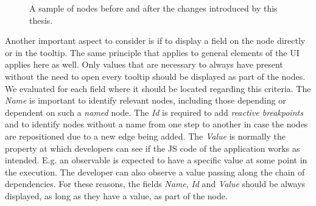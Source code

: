 \begin{figure}[!h]
	\centering
	\hfill
	\caption{A sample of nodes before and after the changes introduced by this thesis.}
	\label{fig:Nodes}
\end{figure}
Another important aspect to consider is if to display a field on the node directly or in the tooltip. The same principle that applies to general elements of the UI applies here as well. Only values that are necessary to always have present without the need to open every tooltip should be displayed as part of the nodes. We evaluated for each field where it should be located regarding this criteria. The \emph{Name} is important to identify relevant nodes, including those depending or dependent on such a \emph{named} node. The \emph{Id} is required to add \emph{reactive breakpoints} and to identify nodes without a name from one step to another in case the nodes are repositioned due to a new edge being added. The \emph{Value} is normally the property at which developers can see if the JS code of the application works as intended. E.g. an observable is expected to have a specific value at some point in the execution. The developer can also observe a value passing along the chain of dependencies. For these reasons, the fields \emph{Name}, \emph{Id} and \emph{Value} should be always displayed, as long as they have a value, as part of the node. %
